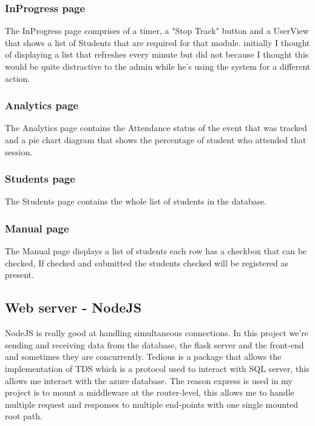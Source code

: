 
\subsubsection{InProgress page}
The InProgress page comprises of a timer, a "Stop Track" button and a UserView that shows a list of Students that are required for that module. initially I thought of displaying a list that refreshes every minute but did not because I thought this would be quite distractive to the admin while he's using the system for a different action. 


\subsubsection{Analytics page}
The Analytics page contains the Attendance status of the event that was tracked and a pie chart diagram that shows the percentage of student who attended that session. 

\subsubsection{Students page}
The Students page contains the whole list of students in the database.

\subsubsection{Manual page}
The Manual page displays a list of students each row has a checkbox that can be checked, If checked and submitted the students checked will be registered as present.



\subsection{Web server - NodeJS}
NodeJS is really good at handling simultaneous connections. In this project we're sending and receiving data from the database, the flask server and the front-end and sometimes they are concurrently. Tedious is a package that allows the implementation of TDS which is a protocol used to interact with SQL server, this allows me interact with the azure database.
The reason express is used in my project is to mount a middleware at the router-level, this allows me to handle multiple request and responses to multiple end-points with one single mounted root path. 

